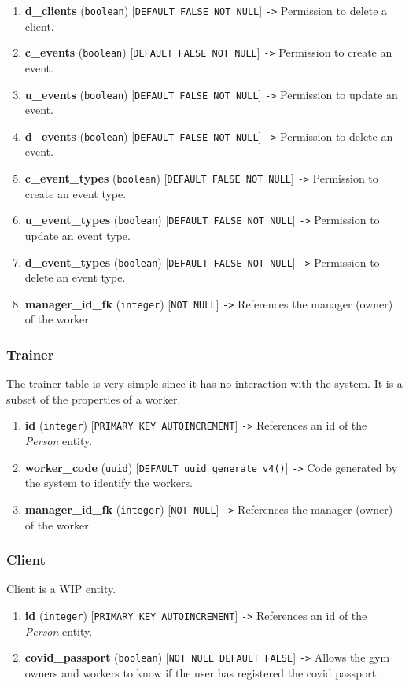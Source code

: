 \documentclass[a4paper, 12pt, oneside]{book}
\begin{document}
\begin{enumerate}[label = -]
	\item \textbf{d\_clients} (\texttt{boolean}) [\texttt{DEFAULT FALSE NOT NULL}] \texttt{->} Permission to delete a client.
	\item \textbf{c\_events} (\texttt{boolean}) [\texttt{DEFAULT FALSE NOT NULL}] \texttt{->} Permission to create an event.
	\item \textbf{u\_events} (\texttt{boolean}) [\texttt{DEFAULT FALSE NOT NULL}] \texttt{->} Permission to update an event.
	\item \textbf{d\_events} (\texttt{boolean}) [\texttt{DEFAULT FALSE NOT NULL}] \texttt{->} Permission to delete an event.
	\item \textbf{c\_event\_types} (\texttt{boolean}) [\texttt{DEFAULT FALSE NOT NULL}] \texttt{->} Permission to create an event type.
	\item \textbf{u\_event\_types} (\texttt{boolean}) [\texttt{DEFAULT FALSE NOT NULL}] \texttt{->} Permission to update an event type.
	\item \textbf{d\_event\_types} (\texttt{boolean}) [\texttt{DEFAULT FALSE NOT NULL}] \texttt{->} Permission to delete an event type.
	\item \textbf{manager\_id\_fk} (\texttt{integer}) [\texttt{NOT NULL}] \texttt{->} References the manager (owner) of the worker.
\end{enumerate}
\subsubsection{Trainer}
The trainer table is very simple since it has no interaction with the system. It is a subset of the properties of a worker.
\begin{enumerate}[label = -]
	\item \textbf{id} (\texttt{integer}) [\texttt{PRIMARY KEY AUTOINCREMENT}] \texttt{->} References an id of the \emph{Person} entity.
	\item \textbf{worker\_code} (\texttt{uuid}) [\texttt{DEFAULT uuid\_generate\_v4()}] \texttt{->} Code generated by the system to identify the workers.
	\item \textbf{manager\_id\_fk} (\texttt{integer}) [\texttt{NOT NULL}] \texttt{->} References the manager (owner) of the worker.
\end{enumerate}
\subsubsection{Client}
Client is a WIP entity.
\begin{enumerate}[label = -]
	\item \textbf{id} (\texttt{integer}) [\texttt{PRIMARY KEY AUTOINCREMENT}] \texttt{->} References an id of the \emph{Person} entity.
	\item \textbf{covid\_passport} (\texttt{boolean}) [\texttt{NOT NULL DEFAULT FALSE}] \texttt{->} Allows the gym owners and workers to know if the user has registered the covid passport.
\end{enumerate}
\end{document}
